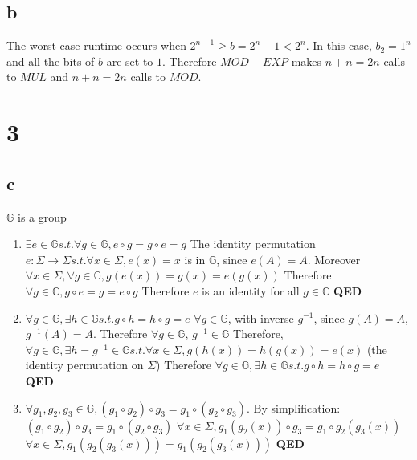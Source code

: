\documentclass[]{article}
\begin{document}
\subsection{b}
The worst case runtime occurs when $2^{n - 1} \geq b = 2^{n} - 1 < 2^{n}$. In this case, $b_2 = 1^n$ and all the bits of $b$ are set to $1$. Therefore $MOD-EXP$ makes $n + n = 2n$ calls to $MUL$ and $n + n = 2n$ calls to $MOD$.

\section{3}
\subsection{c}
$\mathbb{G}$ is a group
\begin{enumerate}
	\item $\exists e \in \mathbb{G} s.t. \forall g \in \mathbb{G}, e \circ g = g \circ e = g$
		\subitem The identity permutation $e: \Sigma \rightarrow \Sigma s.t. \forall x \in \Sigma, e(x) = x$ is in $\mathbb{G}$, since $e(A) = A$.
		\subitem Moreover $\forall x \in \Sigma, \forall g \in \mathbb{G}, g(e(x)) = g(x) = e(g(x))$
		\subitem Therefore $\forall g \in \mathbb{G}, g \circ e = g = e \circ g$
		\subitem Therefore $e$ is an identity for all $g \in \mathbb{G}$
		\subitem \textbf{QED}
	\item $\forall g \in \mathbb{G}, \exists h \in \mathbb{G} s.t. g \circ h = h \circ g = e$
		\subitem $\forall g \in \mathbb{G}$, with inverse $g^{-1}$, since $g(A) = A$, $g^{-1}(A) = A$. Therefore $\forall g \in \mathbb{G}$, $g^{-1} \in \mathbb{G}$
		\subitem Therefore, $\forall g \in \mathbb{G}, \exists h = g^{-1} \in \mathbb{G} s.t. \forall x \in \Sigma, g(h(x)) = h(g(x)) = e(x)$ (the identity permutation on $\Sigma$)
		\subitem Therefore $\forall g \in \mathbb{G}, \exists h \in \mathbb{G} s.t. g \circ h = h \circ g = e$
		\subitem \textbf{QED}
	\item $\forall g_1, g_2, g_3 \in \mathbb{G}, (g_1 \circ g_2) \circ g_3 = g_1 \circ (g_2 \circ g_3)$. By simplification:
		\subitem $(g_1 \circ g_2) \circ g_3 = g_1 \circ (g_2 \circ g_3)$
		\subitem $\forall x \in \Sigma, g_1(g_2(x)) \circ g_3 = g_1 \circ g_2(g_3(x))$
		\subitem $\forall x \in \Sigma, g_1(g_2(g_3(x))) = g_1(g_2(g_3(x)))$
		\subitem \textbf{QED}
\end{enumerate}
\end{document}
